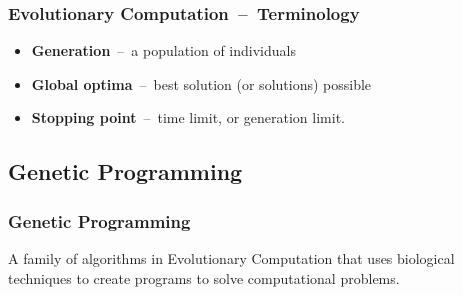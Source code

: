 \documentclass{beamer}
\newcommand{\linespace}{\vskip 0.25cm}
\begin{document}
\begin{frame}
	\frametitle{Evolutionary Computation~--~Terminology}
	\begin{itemize}
		\item \textbf{Generation}~--~a population of individuals
		\linespace
		\item \textbf{Global optima}~--~best solution (or solutions) possible
		\linespace
		\item \textbf{Stopping point}~--~time limit, or generation limit.
	\end{itemize}
\end{frame}

\subsection{Genetic Programming}

\begin{frame}
	\frametitle{Genetic Programming}
	A family of algorithms in Evolutionary Computation that uses biological techniques to create programs to solve computational problems.
\end{frame}
\end{document}
